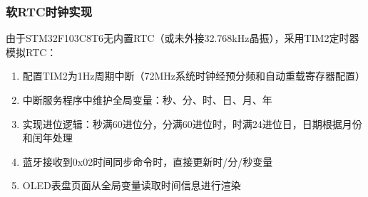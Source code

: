 \subsubsection{软RTC时钟实现}
由于STM32F103C8T6无内置RTC（或未外接32.768kHz晶振），采用TIM2定时器模拟RTC：
\begin{enumerate}
    \item 配置TIM2为1Hz周期中断（72MHz系统时钟经预分频和自动重载寄存器配置）
    \item 中断服务程序中维护全局变量：秒、分、时、日、月、年
    \item 实现进位逻辑：秒满60进位分，分满60进位时，时满24进位日，日期根据月份和闰年处理
    \item 蓝牙接收到0x02时间同步命令时，直接更新时/分/秒变量
    \item OLED表盘页面从全局变量读取时间信息进行渲染
\end{enumerate}